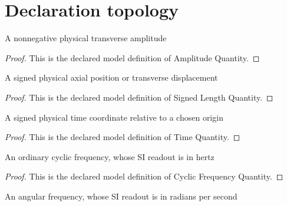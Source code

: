 \section{Declaration topology}
\begin{definition}
  \label{def:physics:phyx-mini-0240:phyxminiproblems-problemphyxmini0240-amplitudequantity}
  A nonnegative physical transverse amplitude
\end{definition}
\begin{proof}
  This is the declared model definition of Amplitude Quantity.
\end{proof}
\begin{definition}
  \label{def:physics:phyx-mini-0240:phyxminiproblems-problemphyxmini0240-signedlengthquantity}
  A signed physical axial position or transverse displacement
\end{definition}
\begin{proof}
  This is the declared model definition of Signed Length Quantity.
\end{proof}
\begin{definition}
  \label{def:physics:phyx-mini-0240:phyxminiproblems-problemphyxmini0240-timequantity}
  A signed physical time coordinate relative to a chosen origin
\end{definition}
\begin{proof}
  This is the declared model definition of Time Quantity.
\end{proof}
\begin{definition}
  \label{def:physics:phyx-mini-0240:phyxminiproblems-problemphyxmini0240-cyclicfrequencyquantity}
  An ordinary cyclic frequency, whose SI readout is in hertz
\end{definition}
\begin{proof}
  This is the declared model definition of Cyclic Frequency Quantity.
\end{proof}
\begin{definition}
  \label{def:physics:phyx-mini-0240:phyxminiproblems-problemphyxmini0240-angularfrequencyquantity}
  An angular frequency, whose SI readout is in radians per second
\end{definition}

